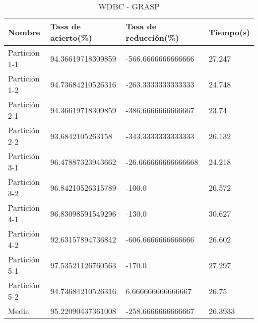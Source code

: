 \begin{table}[H]
	\centering
	\begin{tabular}{l|lll}
		Nombre        & Tasa de acierto(\%) & Tasa de reducción(\%) & Tiempo(s) \\ \hline
		Partición 1-1 & 94.36619718309859   & -566.6666666666666    & 27.247    \\
		Partición 1-2 & 94.73684210526316   & -263.3333333333333    & 24.748    \\
		Partición 2-1 & 94.36619718309859   & -386.6666666666667    & 23.74     \\
		Partición 2-2 & 93.6842105263158    & -343.3333333333333    & 26.132    \\
		Partición 3-1 & 96.47887323943662   & -26.666666666666668   & 24.218    \\
		Partición 3-2 & 96.84210526315789   & -100.0                & 26.572    \\
		Partición 4-1 & 96.83098591549296   & -130.0                & 30.627    \\
		Partición 4-2 & 92.63157894736842   & -606.6666666666666    & 26.602    \\
		Partición 5-1 & 97.53521126760563   & -170.0                & 27.297    \\
		Partición 5-2 & 94.73684210526316   & 6.666666666666667     & 26.75     \\ \hline
		Media         & 95.22090437361008   & -258.6666666666667    & 26.3933  
	\end{tabular}
	\caption{WDBC - GRASP}
	\label{WDBC-GRASP}
\end{table}
